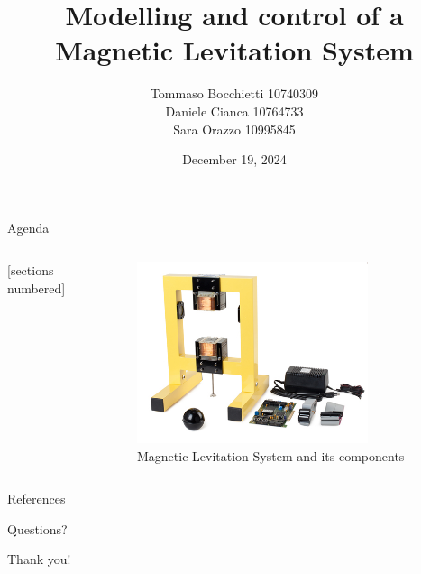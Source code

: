\documentclass[9pt]{beamer}
\title{Modelling and control of a Magnetic Levitation System}
\date{December 19, 2024}
\author{Tommaso Bocchietti 10740309 \\ Daniele Cianca 10764733 \\ Sara Orazzo 10995845}
\institute{Politecnico di Milano}
\begin{document}
\maketitle

\begin{frame}{Agenda}

    \begin{columns}[c, onlytextwidth]

        \begin{column}{0.4\textwidth}

            [sections numbered]
            \tableofcontents

        \end{column}

        \begin{column}{0.6\textwidth}

            \begin{figure}[H]
                \centering
                \includegraphics[width=0.8\textwidth]{img/maglev_and_components.jpg}
                \caption{Magnetic Levitation System and its components}
            \end{figure}

        \end{column}

    \end{columns}

\end{frame}










\appendix

\begin{frame}[allowframebreaks]{References}
    \nocite{*}
    
\end{frame}

\begin{frame}[standout]
    Questions?
\end{frame}

\begin{frame}[standout]
    Thank you!
\end{frame}
\end{document}
